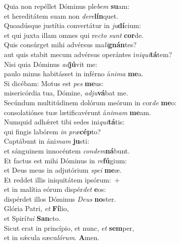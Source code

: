 \evenverse Quia non repéllet Dóminus ple\textit{bem} \textbf{su}am:~\*\\
\evenverse et hereditátem suam non \textit{de}\textit{re}\textbf{lín}quet.\\
\oddverse Quoadúsque justítia convertátur in \textit{ju}\textbf{dí}cium:~\*\\
\oddverse et qui juxta illam omnes qui re\textit{cto} \textit{sunt} \textbf{cor}de.\\
\evenverse Quis consúrget mihi advérsus ma\textit{li}\textbf{gnán}tes?~\*\\
\evenverse aut quis stabit mecum advérsus operántes i\textit{ni}\textit{qui}\textbf{tá}tem?\\
\oddverse Nisi quia Dóminus \textit{ad}\textbf{jú}vit me:~\*\\
\oddverse paulo minus habitásset in inférno á\textit{ni}\textit{ma} \textbf{me}a.\\
\evenverse Si dicébam: Motus est \textit{pes} \textbf{me}us:~\*\\
\evenverse misericórdia tua, Dómine, \textit{ad}\textit{ju}\textbf{vá}bat me.\\
\oddverse Secúndum multitúdinem dolórum meórum in cor\textit{de} \textbf{me}o:~\*\\
\oddverse consolatiónes tuæ lætificavérunt á\textit{ni}\textit{mam} \textbf{me}am.\\
\evenverse Numquid adhǽret tibi sedes ini\textit{qui}\textbf{tá}tis:~\*\\
\evenverse qui fingis labórem \textit{in} \textit{præ}\textbf{cép}to?\\
\oddverse Captábunt in áni\textit{mam} \textbf{ju}sti:~\*\\
\oddverse et sánguinem innocéntem \textit{con}\textit{dem}\textbf{ná}bunt.\\
\evenverse Et factus est mihi Dóminus in \textit{re}\textbf{fú}gium:~\*\\
\evenverse et Deus meus in adjutórium \textit{spe}\textit{i} \textbf{me}æ.\\
\oddverse Et reddet illis iniquitátem ipsórum:~+\\
\oddverse  et in malítia eórum dispér\textit{det} \textbf{e}os:~\*\\
\oddverse dispérdet illos Dóminus \textit{De}\textit{us} \textbf{no}ster.\\
\evenverse Glória Patri, \textit{et} \textbf{Fí}lio,~\*\\
\evenverse et Spirí\textit{tu}\textit{i} \textbf{San}cto.\\
\oddverse Sicut erat in princípio, et nunc, \textit{et} \textbf{sem}per,~\*\\
\oddverse et in sǽcula sæcu\textit{ló}\textit{rum}. \textbf{A}men.\\
